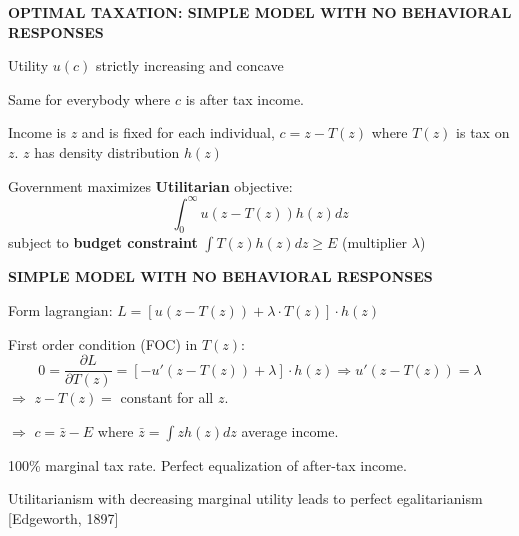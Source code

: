 \documentclass[landscape]{slides}
\begin{document}
\begin{slide}
\begin{center}
{\bf OPTIMAL TAXATION: SIMPLE MODEL WITH NO BEHAVIORAL RESPONSES}
\end{center}

Utility $u(c)$ strictly increasing and concave

Same for everybody where $c$ is after tax income.

Income is $z$ and is fixed for each individual, $c=z-T(z)$ where
$T(z)$ is tax on $z$. $z$ has density distribution $h(z)$

Government maximizes {\bf Utilitarian} objective: 
\[ \int_0^{\infty}
u(z-T(z))h(z)dz \]
subject to {\bf budget constraint} $\int T(z)h(z)dz \geq E$
(multiplier $\lambda$)

\end{slide}

\begin{slide}
\begin{center}
{\bf SIMPLE MODEL WITH NO BEHAVIORAL RESPONSES}
\end{center}

Form lagrangian: $L=[u(z-T(z))+\lambda \cdot T(z)] \cdot h(z)$

First order condition (FOC) in $T(z)$: 
\[ 0= \frac{\partial L}{\partial T(z) } =
[-u'(z-T(z))+\lambda] \cdot h(z) \Rightarrow u'(z-T(z))=\lambda \]
$\Rightarrow$ $z-T(z)=$ constant for all $z$.

$\Rightarrow$ $c=\bar{z}-E$ where $\bar{z}=\int z h(z)dz$ average
income.

100\% marginal tax rate. Perfect equalization of after-tax income.

Utilitarianism with decreasing marginal utility leads to perfect
egalitarianism [Edgeworth, 1897]
\end{slide}

\begin{slide}

\end{slide}

\begin{slide}

\end{slide}
\end{document}
